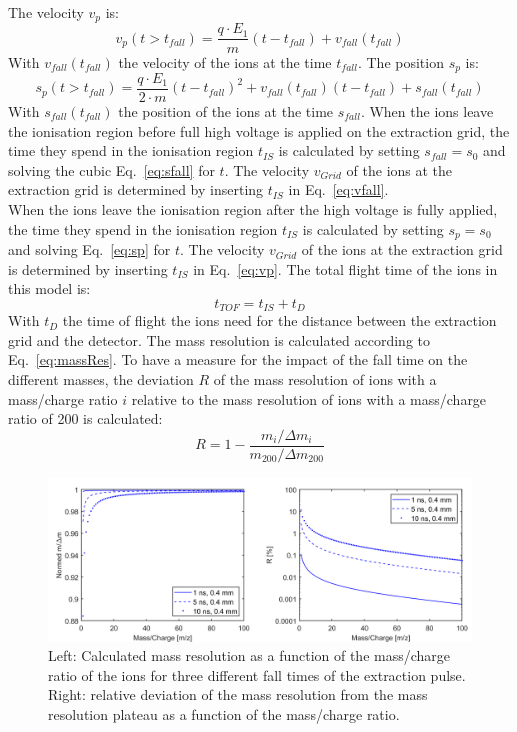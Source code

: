 	The velocity $v_{p}$ is:
	\begin{equation}
		v_{p}(t > t_{fall}) = \frac{q\cdot E_1}{m}(t-t_{fall}) + v_{fall}(t_{fall})
		\label{eq:vp}
	\end{equation}
	With $v_{fall}(t_{fall})$ the velocity of the ions at the time $t_{fall}$. The position $s_{p}$ is:
	\begin{equation}
		s_{p}(t > t_{fall}) = \frac{q\cdot E_1}{2\cdot m}(t-t_{fall})^2 + v_{fall}(t_{fall})(t-t_{fall}) + s_{fall}(t_{fall})
		\label{eq:sp}
	\end{equation}
	With $s_{fall}(t_{fall})$ the position of the ions at the time $s_{fall}$. When the ions leave the ionisation region before full high voltage is applied on the extraction grid, the time they spend in the ionisation region $t_{IS}$ is calculated by setting $s_{fall}=s_0$ and solving the cubic Eq.~\eqref{eq:sfall} for $t$. The velocity $v_{Grid}$ of the ions at the extraction grid is determined by inserting $t_{IS}$ in Eq.~\eqref{eq:vfall}.\\
	When the ions leave the ionisation region after the high voltage is fully applied, the time they spend in the ionisation region $t_{IS}$ is calculated by setting $s_{p}=s_0$ and solving Eq.~\eqref{eq:sp} for $t$. The velocity $v_{Grid}$ of the ions at the extraction grid is determined by inserting $t_{IS}$ in Eq.~\eqref{eq:vp}. The total flight time of the ions in this model is:
	\begin{equation}
		t_{TOF} = t_{IS} + t_D
	\end{equation}
	With $t_{D}$ the time of flight the ions need for the distance between the extraction grid and the detector. The mass resolution is calculated according to Eq.~\eqref{eq:massRes}. To have a measure for the impact of the fall time on the different masses, the deviation $R$ of the mass resolution of ions with a mass/charge ratio $i$ relative to the mass resolution of ions with a mass/charge ratio of 200 is calculated:
	\begin{equation}
		R = 1 - \frac{m_i/\Delta m_i}{m_{200}/\Delta m_{200}}
	\end{equation}
	\begin{figure}[H] %
		\centering
		\includegraphics[width=\textwidth]{Bilder/PulseSimMassRes_Norm.png}
		\caption{Left: Calculated mass resolution as a function of the mass/charge ratio of the ions for three different fall times of the extraction pulse. Right: relative deviation of the mass resolution from the mass resolution plateau as a function of the mass/charge ratio.}
		\label{fig:Simtfall}
	\end{figure}
